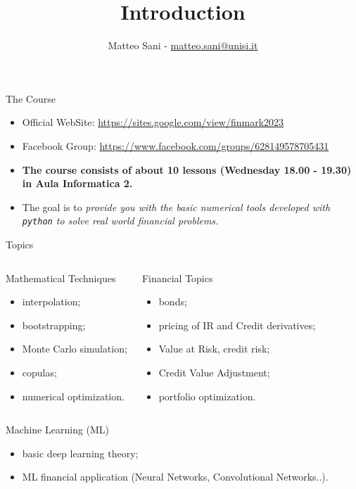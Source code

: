 \documentclass{beamer}
\title{Introduction}
\author{Matteo Sani - \href{mailto:matteo.sani@unisi.it}{matteo.sani@unisi.it}}
\begin{document}
\begin{frame}[plain]
  \maketitle
\end{frame}

\begin{frame}{The Course}
  \begin{itemize}
  \item Official WebSite: \href{https://sites.google.com/view/finmark2023}{https://sites.google.com/view/finmark2023}
  \item Facebook Group: \href{https://www.facebook.com/groups/628149578705431}{https://www.facebook.com/groups/628149578705431}
  \item \textbf{The course consists of about 10 lessons (Wednesday 18.00 - 19.30) in Aula Informatica 2.}
  \item The goal is to \emph{provide you with the basic numerical tools developed with \texttt{python} to solve real world financial problems.}
  \end{itemize}
\end{frame}

\begin{frame}{Topics}
  \begin{columns}
    \begin{block}{Mathematical Techniques}
      \begin{itemize}
      \item interpolation;
      \item bootstrapping;
      \item Monte Carlo simulation;
      \item copulas;
      \item numerical optimization.
      \end{itemize}
    \end{block}
    \begin{block}{Financial Topics}
      \begin{itemize}
      \item bonds;
      \item pricing of IR and Credit derivatives;
      \item Value at Risk, credit risk;
      \item Credit Value Adjustment;
      \item portfolio optimization.
      \end{itemize}
    \end{block}
  \end{columns}
  \begin{block}{Machine Learning (ML)}
    \begin{itemize}
    \item basic deep learning theory;
    \item ML financial application (Neural Networks, Convolutional Networks..).
    \end{itemize}
  \end{block}
\end{frame}
\end{document}
